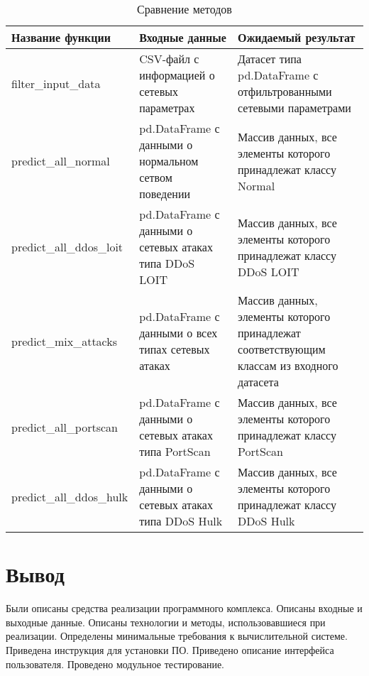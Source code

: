 \begin{center}
    \captionsetup{justification=raggedleft,singlelinecheck=off}
    \begin{longtable}[c]{|P{5cm}|P{6cm}|P{5.2cm}|}
    \caption{Сравнение методов \label{tbl:tests}}
    \\ \hline
        \textbf{Название функции} &
        \textbf{Входные данные} &
        \textbf{Ожидаемый результат} 
    \\ \hline
        filter\_input\_data &
        CSV-файл с информацией о сетевых параметрах &
        Датасет типа pd.DataFrame \cite{pddataframe} с отфильтрованными сетевыми параметрами
    \\ \hline
        predict\_all\_normal &
        pd.DataFrame с данными о нормальном сетвом поведении  &
        Массив данных, все элементы которого принадлежат классу Normal
    \\ \hline
        predict\_all\_ddos\_loit &
        pd.DataFrame с данными о сетевых атаках типа DDoS LOIT &
        Массив данных, все элементы которого принадлежат классу DDoS LOIT
    \\ \hline
        predict\_mix\_attacks &
        pd.DataFrame с данными о всех типах сетевых атаках &
        Массив данных, элементы которого принадлежат соответствующим классам из входного датасета 
    \\ \hline
    predict\_all\_portscan &
    pd.DataFrame с данными о сетевых атаках типа PortScan &
    Массив данных, все элементы которого принадлежат классу PortScan
    \\ \hline
    predict\_all\_ddos\_hulk &
    pd.DataFrame с данными о сетевых атаках типа DDoS Hulk &
    Массив данных, все элементы которого принадлежат классу DDoS Hulk
    \\ \hline
\end{longtable}
\end{center}


\section{Вывод}
Были описаны средства реализации программного комплекса. 
Описаны входные и выходные данные. Описаны технологии и методы, использовавшиеся при реализации.
Определены минимальные требования к вычислительной системе. Приведена инструкция
для установки ПО. Приведено описание интерфейса пользователя. Проведено модульное тестирование.


